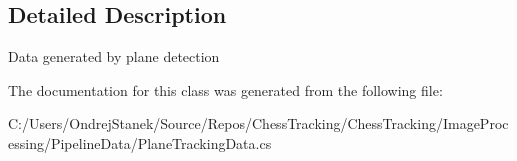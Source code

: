 \subsection{Detailed Description}
Data generated by plane detection 



The documentation for this class was generated from the following file\+:\begin{DoxyCompactItemize}
\item 
C\+:/\+Users/\+Ondrej\+Stanek/\+Source/\+Repos/\+Chess\+Tracking/\+Chess\+Tracking/\+Image\+Processing/\+Pipeline\+Data/Plane\+Tracking\+Data.\+cs\end{DoxyCompactItemize}
